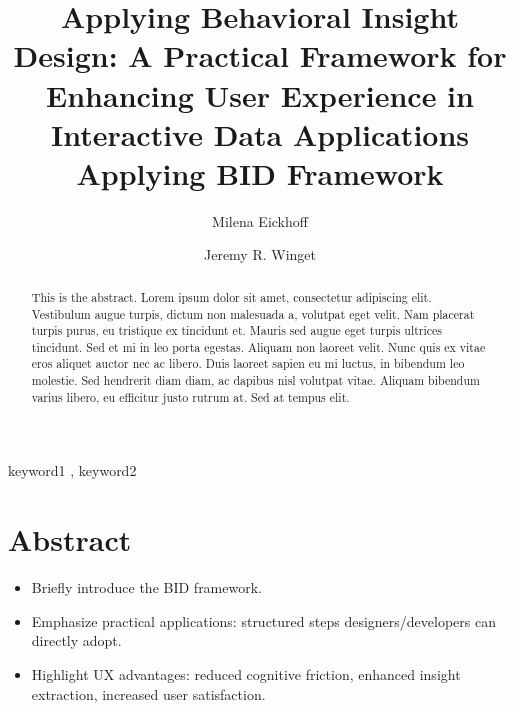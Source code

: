 \documentclass[
  authoryear,
  preprint]{elsarticle}
\providecommand{\tightlist}{%
  \setlength{\itemsep}{0pt}\setlength{\parskip}{0pt}}\usepackage{longtable,booktabs,array}
\begin{document}
\begin{frontmatter}
\title{Applying Behavioral Insight Design: A Practical Framework for
Enhancing User Experience in Interactive Data
Applications \\\large{Applying BID Framework} }
\author[1]{Milena Eickhoff%
%
}
\author[2]{Jeremy R. Winget%
%
}


        
\begin{abstract}
This is the abstract. Lorem ipsum dolor sit amet, consectetur adipiscing
elit. Vestibulum augue turpis, dictum non malesuada a, volutpat eget
velit. Nam placerat turpis purus, eu tristique ex tincidunt et. Mauris
sed augue eget turpis ultrices tincidunt. Sed et mi in leo porta
egestas. Aliquam non laoreet velit. Nunc quis ex vitae eros aliquet
auctor nec ac libero. Duis laoreet sapien eu mi luctus, in bibendum leo
molestie. Sed hendrerit diam diam, ac dapibus nisl volutpat vitae.
Aliquam bibendum varius libero, eu efficitur justo rutrum at. Sed at
tempus elit.
\end{abstract}





\begin{keyword}
    keyword1 \sep 
    keyword2
\end{keyword}
\end{frontmatter}
    

\section{Abstract}\label{abstract}

\begin{itemize}
\tightlist
\item
  Briefly introduce the BID framework.
\item
  Emphasize practical applications: structured steps
  designers/developers can directly adopt.
\item
  Highlight UX advantages: reduced cognitive friction, enhanced insight
  extraction, increased user satisfaction.
\end{itemize}
\end{document}
